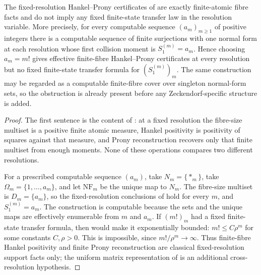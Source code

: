 \begin{theorem}
\label{thm:hankel-prony-transfer-independence}
\label{thm:finite-fibre-finite-state-separation}
The fixed-resolution Hankel--Prony certificates of
 are exactly
finite-atomic fibre facts and do not imply any fixed finite-state transfer law in
the resolution variable.  More precisely, for every computable sequence
\((a_m)_{m\ge1}\) of positive integers there is a computable sequence of finite
surjections with one normal form at each resolution whose first collision moment
is \(S_1^{(m)}=a_m\).  Hence choosing \(a_m=m!\) gives effective finite-fibre
Hankel--Prony certificates at every resolution but no fixed finite-state transfer
formula for \((S_1^{(m)})_m\).  The same construction may be regarded as a
computable finite-fibre cover over singleton normal-form sets, so the obstruction
is already present before any Zeckendorf-specific structure is added.
\end{theorem}

\begin{proof}
The first sentence is the content of
: at a fixed resolution the fibre-size
multiset is a positive finite atomic measure, Hankel positivity is positivity of
squares against that measure, and Prony reconstruction recovers only that finite
multiset from enough moments.  None of these operations compares two different
resolutions.

For a prescribed computable sequence \((a_m)\), take
\(N_m=\{*_m\}\), take \(\Omega_m=\{1,\ldots,a_m\}\), and let
\(\mathrm{NF}_m\) be the unique map to \(N_m\).  The fibre-size multiset is
\(D_m=\{a_m\}\), so the fixed-resolution conclusions of
 hold for every \(m\), and
\(S_1^{(m)}=a_m\).  The construction is computable because the sets and the
unique maps are effectively enumerable from \(m\) and \(a_m\).  If
\((m!)_m\) had a fixed finite-state transfer formula, then
 would make it exponentially bounded:
\(m!\le C\rho^m\) for some constants \(C,\rho>0\).  This is impossible,
since \(m!/\rho^m\to\infty\).  Thus finite-fibre Hankel positivity and
finite Prony reconstruction are classical fixed-resolution support facts only;
the uniform matrix representation of  is
an additional cross-resolution hypothesis.
\end{proof}

